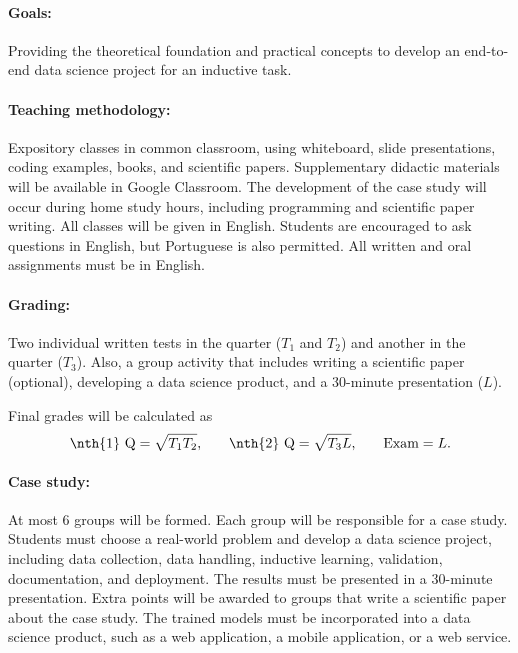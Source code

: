 \paragraph{Goals:}
Providing the theoretical foundation and practical concepts to develop an end-to-end
data science project for an inductive task.

\paragraph{Teaching methodology:}
Expository classes in common classroom, using whiteboard, slide presentations, coding
examples, books, and scientific papers.  Supplementary didactic materials will be available
in Google Classroom. The development of the case study will occur during home study
hours, including programming and scientific paper writing.  All classes will be given in
English.  Students are encouraged to ask questions in English, but Portuguese is also
permitted. All written and oral assignments must be in English.

\paragraph{Grading:} Two individual written tests in the  quarter ($T_1$ and $T_2$) and
another in the  quarter ($T_3$).  Also, a group activity that includes writing a
scientific paper (optional), developing a data science product, and a 30-minute presentation ($L$).

Final grades will be calculated as
\begin{equation*}
  \text{\nth{1} Q} = \sqrt{T_1 T_2}\text{,} \qquad
  \text{\nth{2} Q} = \sqrt{T_3 L}\text{,} \qquad
  \text{Exam} = L\text{.}
\end{equation*}

\paragraph{Case study:} At most 6 groups will be formed.  Each group will be responsible for
a case study.  Students must choose a real-world problem and develop a data science
project, including data collection, data handling, inductive learning, validation,
documentation, and deployment. The results must be presented in a 30-minute presentation.
Extra points will be awarded to groups that write a scientific paper about the case study.
The trained models must be incorporated into a data science product, such as a web
application, a mobile application, or a web service.

